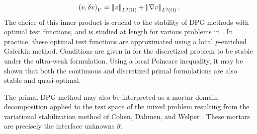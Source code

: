 \[
\left( v,\delta v \right)_V = \left\| v \right\|_{L^2\left( \Omega \right)} + \left\| \nabla v \right\|_{L^2\left( \Omega \right)}.
\]
The choice of this inner product is crucial to the stability of DPG methods with optimal test functions, and is studied at length for various problems in \cite{DPG4, DPG5, DPGStokes, DemkowiczHeuer, chan2014robust}.  In practice, these optimal test functions are approximated using a local $p$-enriched Galerkin method.  Conditions are given in \cite{GopalakrishnanQiu11} for the discretized problem to be stable under the ultra-weak formulation.  Using a local Poincare inequality, it may be shown that both the continuous and discretized primal formulations are also stable and quasi-optimal.  

The primal DPG method may also be interpreted as a mortar domain decomposition applied to the test space of the mixed problem resulting from the variational stabilization method of Cohen, Dahmen, and Welper \cite{dahmen, WienersWohlmuth}.  These mortars are precisely the interface unknowns $\widehat{\sigma}$.  

